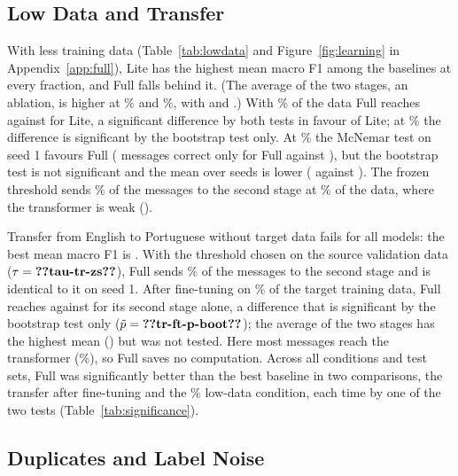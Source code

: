 \subsection{Low Data and Transfer}\label{sec:lowdata}

With less training data (Table~\ref{tab:lowdata} and Figure~\ref{fig:learning} in Appendix~\ref{app:full}), Lite has the highest mean macro F1 among the baselines at every fraction, and Full falls behind it. (The average of the two stages, an ablation, is higher at \% and \%, with  and .) With \% of the data Full reaches  against  for Lite, a significant difference by both tests in favour of Lite; at \% the difference is significant by the bootstrap test only. At \% the McNemar test on seed 1 favours Full ( messages correct only for Full against ), but the bootstrap test is not significant and the mean over seeds is lower ( against ). The frozen threshold sends \% of the messages to the second stage at \% of the data, where the transformer is weak ().

Transfer from English to Portuguese without target data fails for all models: the best mean macro F1 is . With the threshold chosen on the source validation data ($\tau=\val{tau-tr-zs}$), Full sends \% of the messages to the second stage and is identical to it on seed 1. After fine-tuning on \% of the target training data, Full reaches  against  for its second stage alone, a difference that is significant by the bootstrap test only ($\tilde{p}=\val{tr-ft-p-boot}$); the average of the two stages has the highest mean () but was not tested. Here most messages reach the transformer (\%), so Full saves no computation. Across all conditions and test sets, Full was significantly better than the best baseline in two comparisons, the transfer after fine-tuning and the \% low-data condition, each time by one of the two tests (Table~\ref{tab:significance}).

\subsection{Duplicates and Label Noise}\label{sec:duplicates}



